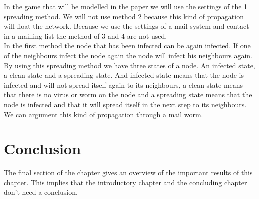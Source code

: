 In the game that will be modelled in the paper we will use the settings of the 1 spreading method. We will not use method 2 because this kind of propagation will float the network. Because we use the settings of a mail system and contact in a mailling list the method of 3 and 4 are not used. \\
In the first method the node that has been infected can be again infected. If one of the neighbours infect the node again the node will infect his neighbours again. By using this spreading method we have three states of a node. An infected state, a clean state and a spreading state. And infected state means that the node is infected and will not spread itself again to its neighbours, a clean state means that there is no virus or worm on the node and a spreading state means that the node is infected and that it will spread itself in the next step to its neighbours.
We can argument this kind of propagation through a mail worm. 

\section{Conclusion}
The final section of the chapter gives an overview of the important results
of this chapter. This implies that the introductory chapter and the
concluding chapter don't need a conclusion.



